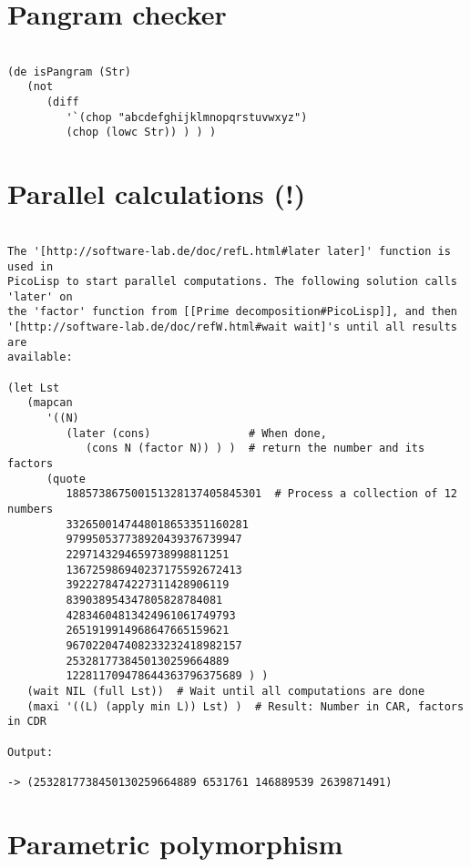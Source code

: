 \section*{Pangram checker}

\begin{verbatim}

(de isPangram (Str)
   (not
      (diff
         '`(chop "abcdefghijklmnopqrstuvwxyz")
         (chop (lowc Str)) ) ) )

\end{verbatim}

\section*{Parallel calculations (!)}

\begin{verbatim}

The '[http://software-lab.de/doc/refL.html#later later]' function is used in
PicoLisp to start parallel computations. The following solution calls 'later' on
the 'factor' function from [[Prime decomposition#PicoLisp]], and then
'[http://software-lab.de/doc/refW.html#wait wait]'s until all results are
available:

(let Lst
   (mapcan
      '((N)
         (later (cons)               # When done,
            (cons N (factor N)) ) )  # return the number and its factors
      (quote
         188573867500151328137405845301  # Process a collection of 12 numbers
         3326500147448018653351160281
         979950537738920439376739947
         2297143294659738998811251
         136725986940237175592672413
         3922278474227311428906119
         839038954347805828784081
         42834604813424961061749793
         2651919914968647665159621
         967022047408233232418982157
         2532817738450130259664889
         122811709478644363796375689 ) )
   (wait NIL (full Lst))  # Wait until all computations are done
   (maxi '((L) (apply min L)) Lst) )  # Result: Number in CAR, factors in CDR

Output:

-> (2532817738450130259664889 6531761 146889539 2639871491)

\end{verbatim}

\section*{Parametric polymorphism}

